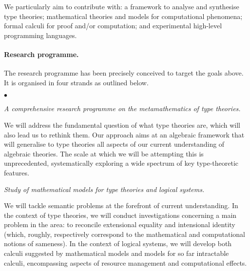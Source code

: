 \documentclass[11pt,twocolumn]{article}
\newenvironment{myitemize}
  {\begin{list}{$\bullet$}
  {\setlength{\topsep}{1pt}
   \setlength{\partopsep}{1pt}
   \setlength{\itemsep}{0pt}
   \setlength{\parsep}{0pt}
   \setlength{\leftmargin}{1em}
   \setlength{\labelwidth}{.5em}}}
  {\end{list}}
\begin{document}
We particularly aim to contribute with: a framework to analyse and synthesise
type theories; mathematical theories and models for computational phenomena;
formal calculi for proof and/or computation; and experimental high-level
programming languages.

\paragraph*{Research programme.}

The research programme has been precisely conceived to target the goals
above.  It is organised in four strands as outlined below.
\begin{myitemize}
\item[{\bfseries 1\enspace Foundations:}]\mbox{}\enspace\thinspace 
  \emph{A comprehensive research programme on the metamathematics of type
    theories.}

  \vspace*{1mm}
  We will address the fundamental question of what type theories are,
  which will also lead us to rethink them.  
  Our approach 
  aims at an algebraic framework that will generalise to type theories all
  aspects of our current understanding of algebraic
  theories. %
  The scale at which we will be attempting this is unprecedented,
  systematically exploring a wide spectrum of key type-theoretic features.
  \vspace*{1mm}

\item[{\bfseries 2\enspace Models:}]\mbox{}\enspace\thinspace
  \emph{Study of mathematical models for type theories and logical systems.}

  \vspace*{1mm}
  We will tackle semantic problems at the forefront of current understanding.
  In the context of type theories, we will conduct investigations
  concerning a main problem in the area: to reconcile extensional equality
  and intensional identity (which, roughly, respectively correspond to the
  mathematical and computational notions of sameness).  
  In the context of logical systems, we will develop both %
  calculi suggested by mathematical models and %
  models for so far intractable calculi, encompassing aspects of resource
  management and computational effects.  
  \vspace*{-3mm}%
  

\end{myitemize}
\end{document}
